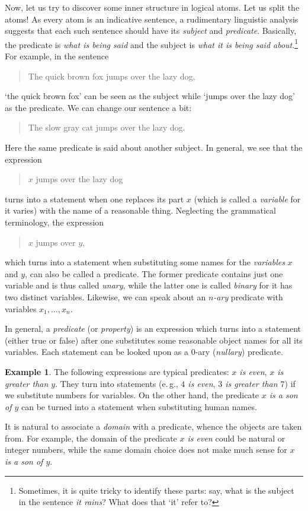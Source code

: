 \documentclass[12pt,notitlepage]{article}
\theoremstyle{plain}
\theoremstyle{definition}
\newtheorem{exm}[thm]{Example}
\theoremstyle{plain}
\newcommand{\1}{\mathbf{1}}
\newcommand{\0}{\mathbf{0}}
\begin{document}
Now, let us try to discover some inner structure in logical atoms. Let us split the atoms! As every atom is an indicative sentence, a rudimentary linguistic analysis suggests that each such sentence should have its \emph{subject} and \emph{predicate}.  Basically, the predicate is \emph{what is being said} and the subject is \emph{what it is being said about}.\footnote{Sometimes, it is quite tricky to identify these parts: say, what is the subject in the sentence \emph{it rains}? What does that `it' refer to?} For example, in the sentence
\begin{quote}
The quick brown fox jumps over the lazy dog,
\end{quote}
`the quick brown fox' can be seen as the subject while `jumps over the lazy dog' as the predicate. We can change our sentence a bit:
\begin{quote}
The slow gray cat jumps over the lazy dog.
\end{quote}
Here the same predicate is said about another subject. In general, we see that the expression
\begin{quote}
$x$ jumps over the lazy dog
\end{quote}
turns into a statement when one replaces its part $x$ (which is called a \emph{variable} for it varies) with the name of a reasonable thing.  Neglecting the grammatical terminology, the expression
\begin{quote}
$x$ jumps over $y$,
\end{quote}
which turns into a statement when substituting some names for the \emph{variables} $x$ and $y$, can also be called a predicate. The former predicate contains just one variable and is thus called \emph{unary}, while the latter one is called \emph{binary} for it has two distinct variables. Likewise, we can speak about an \emph{$n$-ary} predicate with variables $x_1,\ldots,x_n$.

In general, a \emph{predicate} (or \emph{property}) is an expression which turns into a statement (either true or false) after one substitutes some reasonable object names for all its variables. Each statement can be looked upon as a $0$-ary (\emph{nullary}) predicate.

\begin{exm}
The following expressions are typical predicates: \emph{$x$ is even}, \emph{$x$ is greater than $y$}. They turn into statements (e.\,g., \emph{$4$ is even}, \emph{$3$ is greater than $7$}) if we substitute numbers for variables. On the other hand, the predicate \emph{$x$ is a son of $y$} can be turned into a statement when substituting human names.
\end{exm}
It is natural to associate a \emph{domain} with a predicate, whence the objects are taken from. For example, the domain of the predicate \emph{$x$ is even} could be natural or integer numbers, while the same domain choice does not make much sense for \emph{$x$ is a son of $y$}.
\end{document}
